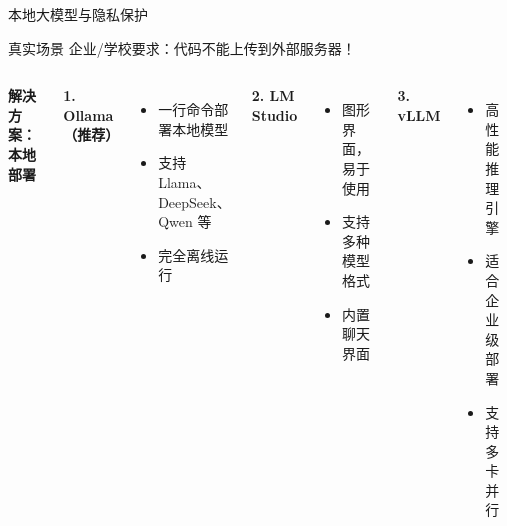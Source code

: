 \begin{frame}{本地大模型与隐私保护}
	\begin{alertblock}{真实场景}
		企业/学校要求：代码不能上传到外部服务器！
	\end{alertblock}

	\vspace{0.3cm}

	\begin{columns}
		\textbf{解决方案：本地部署}

		\vspace{0.3cm}

		\textbf{1. Ollama（推荐）}
		\begin{itemize}
			\item 一行命令部署本地模型
			\item 支持 Llama、DeepSeek、Qwen 等
			\item 完全离线运行
		\end{itemize}

		\textbf{2. LM Studio}
		\begin{itemize}
			\item 图形界面，易于使用
			\item 支持多种模型格式
			\item 内置聊天界面
		\end{itemize}

		\vspace{0.3cm}

		\textbf{3. vLLM}
		\begin{itemize}
			\item 高性能推理引擎
			\item 适合企业级部署
			\item 支持多卡并行
		\end{itemize}
	\end{columns}
\end{frame}


